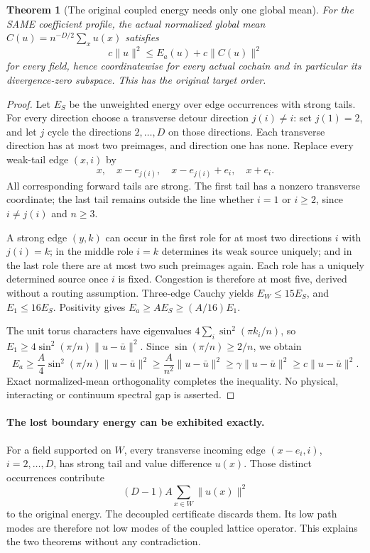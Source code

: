 \documentclass[11pt]{article}
\newtheorem{theorem}{Theorem}
\begin{document}
\begin{theorem}[The original coupled energy needs only one global mean]\label{thm:positive}
For the SAME coefficient profile, the actual normalized global mean
$C(u)=n^{-D/2}\sum_xu(x)$ satisfies
\[
 c\|u\|^2\le E_a(u)+c\|C(u)\|^2
\]
for every field, hence coordinatewise for every actual cochain and in particular its divergence-zero subspace. This has the original target order.
\end{theorem}
\begin{proof}
Let $E_S$ be the unweighted energy over edge occurrences with strong tails. For every direction choose a transverse detour direction $j(i)\ne i$: set $j(1)=2$, and let $j$ cycle the directions $2,\ldots,D$ on those directions. Each transverse direction has at most two preimages, and direction one has none. Replace every weak-tail edge $(x,i)$ by
\[
 x,\quad x-e_{j(i)},\quad x-e_{j(i)}+e_i,\quad x+e_i.
\]
All corresponding forward tails are strong. The first tail has a nonzero transverse coordinate; the last tail remains outside the line whether $i=1$ or $i\ge2$, since $i\ne j(i)$ and $n\ge3$.

A strong edge $(y,k)$ can occur in the first role for at most two directions $i$ with $j(i)=k$; in the middle role $i=k$ determines its weak source uniquely; and in the last role there are at most two such preimages again. Each role has a uniquely determined source once $i$ is fixed. Congestion is therefore at most five, derived without a routing assumption. Three-edge Cauchy yields $E_W\le15E_S$, and $E_1\le16E_S$. Positivity gives $E_a\ge A E_S\ge(A/16)E_1$.

The unit torus characters have eigenvalues $4\sum_i\sin^2(\pi k_i/n)$, so $E_1\ge4\sin^2(\pi/n)\|u-\bar u\|^2$. Since $\sin(\pi/n)\ge2/n$, we obtain
\[
 E_a\ge\frac A4\sin^2(\pi/n)\|u-\bar u\|^2
 \ge\frac A{n^2}\|u-\bar u\|^2\ge\gamma\|u-\bar u\|^2\ge c\|u-\bar u\|^2.
\]
Exact normalized-mean orthogonality completes the inequality. No physical, interacting or continuum spectral gap is asserted.
\end{proof}

\paragraph{The lost boundary energy can be exhibited exactly.}
For a field supported on $W$, every transverse incoming edge $(x-e_i,i)$, $i=2,\ldots,D$, has strong tail and value difference $u(x)$. Those distinct occurrences contribute
\[
 (D-1)A\sum_{x\in W}\|u(x)\|^2
\]
to the original energy. The decoupled certificate discards them. Its low path modes are therefore not low modes of the coupled lattice operator. This explains the two theorems without any contradiction.
\end{document}
